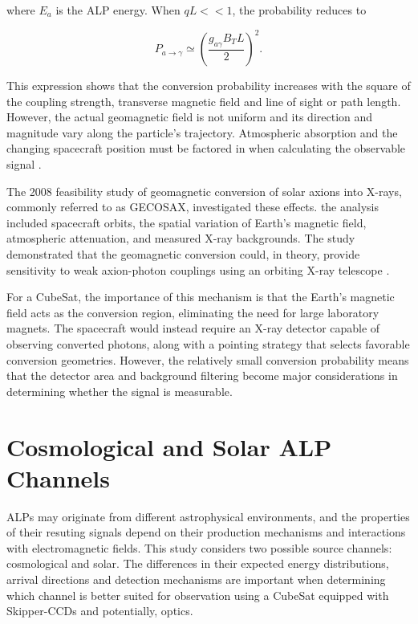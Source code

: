 \documentclass[10pt,letterpaper,twocolumn]{article}
\begin{document}
where $E_a$ is the ALP energy. When $qL << 1$, the probability reduces to 

\begin{equation}
P_{a\rightarrow\gamma}
\simeq
\left(\frac{g_{a\gamma}B_TL}{2}\right)^2.
\end{equation}

This expression shows that the conversion probability increases with the square of the coupling strength, transverse magnetic field and line of  sight or path length. However, the actual geomagnetic field is not uniform and its direction and magnitude vary along the particle's trajectory. Atmospheric absorption and the changing spacecraft position must be factored in when calculating the observable signal \cite{yamamoto2020alp}.

The 2008 feasibility study of geomagnetic conversion of solar axions into X-rays, commonly referred to as GECOSAX, investigated these effects. the analysis included spacecraft orbits, the spatial variation of Earth's magnetic field, atmospheric attenuation, and measured X-ray backgrounds. The study demonstrated that the geomagnetic conversion could, in theory, provide sensitivity to weak axion-photon couplings  using an orbiting X-ray telescope \cite{davoudiasl2008gecosax}.

For a CubeSat, the importance of this mechanism is that the Earth's magnetic field acts as the conversion region, eliminating the need for large laboratory magnets. The spacecraft would instead require an X-ray detector capable of observing converted photons, along with a pointing strategy that selects favorable conversion geometries. However, the relatively small conversion probability means that the detector area and background filtering become major considerations in determining whether the signal is measurable.

\section{Cosmological and Solar ALP Channels}

ALPs may originate from different astrophysical environments, and the properties of their resuting signals depend on their production mechanisms and interactions with electromagnetic fields. This study considers two possible source channels: cosmological and solar. The differences in their expected energy distributions, arrival directions and detection mechanisms are important when determining which channel is better suited for observation using a CubeSat equipped with Skipper-CCDs and potentially, optics. 
\end{document}
